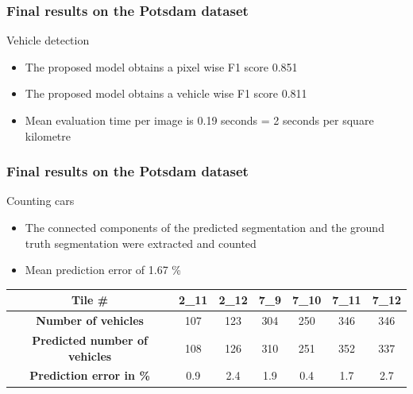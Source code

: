 \documentclass[aspectratio=1610]{beamer}
\begin{document}
\begin{frame}
  \frametitle{\hfill Final results on the Potsdam dataset}
	  \begin{block}{Vehicle detection}
    \begin{itemize}
    \item The proposed model obtains a pixel wise F1 score 0.851
    \item The proposed model obtains a vehicle wise F1 score 0.811
    \item Mean evaluation time per image is 0.19 seconds = 2 seconds per square kilometre 
    \end{itemize}
  \end{block}
\end{frame}


\begin{frame}
  \frametitle{\hfill Final results on the Potsdam dataset}
	  \begin{block}{Counting cars}
    \begin{itemize}
    \item The connected components of the predicted segmentation and the ground truth segmentation were extracted and counted
    \item Mean prediction error of 1.67 \%
    \end{itemize}
    \begin{tabular}{|c c c c c c c|}
\hline
\textbf{Tile \#} & 2\_11  & 2\_12 & 7\_9 & 7\_10 & 7\_11 & 7\_12 \\
\hline
\textbf{Number of vehicles} & 107 & 123 & 304 & 250 & 346 & 346 \\
\textbf{Predicted number of vehicles} & 108 & 126 & 310 & 251 & 352 & 337 \\
\textbf{Prediction error in \%} &0.9 &  2.4 & 1.9 & 0.4 & 1.7 & 2.7\\
\hline
\end{tabular}
  \end{block}
\end{frame}
\end{document}
